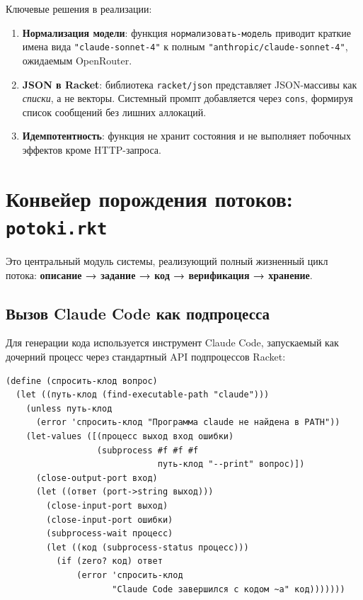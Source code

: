 \documentclass[11pt,a4paper]{article}
\begin{document}
Ключевые решения в реализации:

\begin{enumerate}[noitemsep]
  \item \textbf{Нормализация модели}: функция \texttt{нормализовать-модель}
    приводит краткие имена вида \texttt{"claude-sonnet-4"} к полным
    \texttt{"anthropic/claude-sonnet-4"}, ожидаемым OpenRouter.
  \item \textbf{JSON в Racket}: библиотека \texttt{racket/json} представляет
    JSON-массивы как \emph{списки}, а не векторы. Системный промпт
    добавляется через \texttt{cons}, формируя список сообщений без
    лишних аллокаций.
  \item \textbf{Идемпотентность}: функция не хранит состояния и не выполняет
    побочных эффектов кроме HTTP-запроса.
\end{enumerate}

\section{Конвейер порождения потоков: \texttt{potoki.rkt}}

Это центральный модуль системы, реализующий полный жизненный цикл потока:
\textbf{описание → задание → код → верификация → хранение}.

\subsection{Вызов Claude Code как подпроцесса}

Для генерации кода используется инструмент Claude Code, запускаемый как
дочерний процесс через стандартный API подпроцессов Racket:

\begin{lstlisting}[language=Racket, caption={Вызов Claude Code (potoki.rkt)}]
(define (спросить-клод вопрос)
  (let ((путь-клод (find-executable-path "claude")))
    (unless путь-клод
      (error 'спросить-клод "Программа claude не найдена в PATH"))
    (let-values ([(процесс выход вход ошибки)
                  (subprocess #f #f #f
                              путь-клод "--print" вопрос)])
      (close-output-port вход)
      (let ((ответ (port->string выход)))
        (close-input-port выход)
        (close-input-port ошибки)
        (subprocess-wait процесс)
        (let ((код (subprocess-status процесс)))
          (if (zero? код) ответ
              (error 'спросить-клод
                     "Claude Code завершился с кодом ~a" код)))))))
\end{lstlisting}
\end{document}
